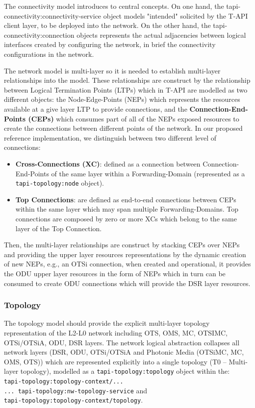 \documentclass[a4paper,fleqn]{cas-dc}
\begin{document}
The connectivity model introduces to central concepts. On one hand, the tapi-connectivity:connectivity-service  object models "intended" solicited by the T-API client layer, to be deployed into the network. On the other hand, the tapi-connectivity:connection objects represents the actual adjacencies between logical interfaces created by configuring the network, in brief the connectivity configurations in the network. 

The network model is multi-layer so it is needed to establish multi-layer relationships into the model. These relationships are construct by the relationship between Logical Termination Points (LTPs) which in T-API are modelled as two different objects: the Node-Edge-Points (NEPs) which represents the resources available at a give layer LTP to provide connections, and the \textbf{Connection-End-Points (CEPs)} which consumes part of all of the NEPs exposed resources to create the connections between different points of the network. In our proposed reference implementation, we distinguish between two different level of connections:

\begin{itemize}
    \item \textbf{Cross-Connections (XC)}: defined as a connection between Connection-End-Points of the same layer within a Forwarding-Domain (represented as a\\ \texttt{tapi-topology:node} object). 
    \item \textbf{Top Connections}: are defined as end-to-end connections between CEPs within the same layer which may span multiple Forwarding-Domains. Top connections are composed by zero or more XCs which belong to the same layer of the Top Connection.
\end{itemize}

Then, the multi-layer relationships are construct by stacking CEPs over NEPs and providing the upper layer resources representations by the dynamic creation of new NEPs, e.g., an OTSi connection, when created and operational, it provides the ODU upper layer resources in the form of NEPs which in turn can be consumed to create ODU connections which will provide the DSR layer resources.

\subsubsection{Topology}
\label{subsection:OPTopo}

The topology model should provide the explicit multi-layer topology representation of the L2-L0 network including OTS, OMS, MC, OTSIMC, OTSi/OTSiA, ODU, DSR layers. The network logical abstraction collapses all network layers (DSR, ODU, OTSi/OTSiA and Photonic Media (OTSiMC, MC, OMS, OTS)) which are represented explicitly into a single topology (T0 – Multi-layer topology), modelled as a \texttt{tapi-topology:topology} object within the: \\
\texttt{tapi-topology:topology-context/... \\
... tapi-topology:nw-topology-service} and \\ \texttt{tapi-topology:topology-context/topology}. 
\end{document}

